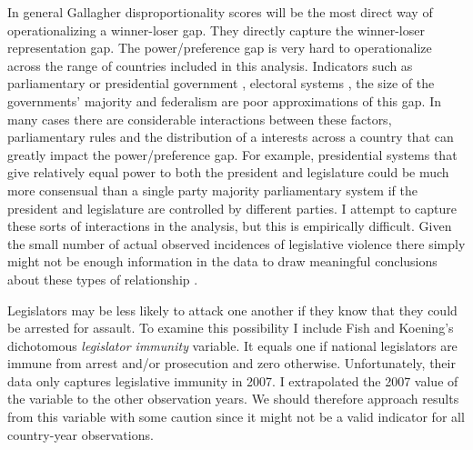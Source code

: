 \documentclass[a4paper]{article}\usepackage{graphicx, color}
\begin{document}
In general Gallagher disproportionality scores will be the most direct way of operationalizing a winner-loser gap. They directly capture the winner-loser representation gap. The power/preference gap is very hard to operationalize across the range of countries included in this analysis. Indicators such as parliamentary or presidential government \citep{Horowitz1990}, electoral systems \cite{Lijphart1994}, the size of the governments' majority and federalism are poor approximations of this gap. In many cases there are considerable interactions between these factors, parliamentary rules and the distribution of a interests across a country that can greatly impact the power/preference gap. For example, presidential systems that give relatively equal power to both the president and legislature could be much more consensual than a single party majority parliamentary system if the president and legislature are controlled by different parties. I attempt to capture these sorts of interactions in the analysis, but this is empirically difficult. Given the small number of actual observed incidences of legislative violence there simply might not be enough information in the data to draw meaningful conclusions about these types of relationship \citep[see][]{Brambor2006}.

Legislators may be less likely to attack one another if they know that they could be arrested for assault. To examine this possibility I include Fish and Koening's \citeyearpar{Fish2009} dichotomous \emph{legislator immunity} variable. It equals one if national legislators are immune from arrest and/or prosecution and zero otherwise. Unfortunately, their data only captures legislative immunity in 2007. I extrapolated the 2007 value of the variable to the other observation years. We should therefore approach results from this variable with some caution since it might not be a valid indicator for all country-year observations.
\end{document}
